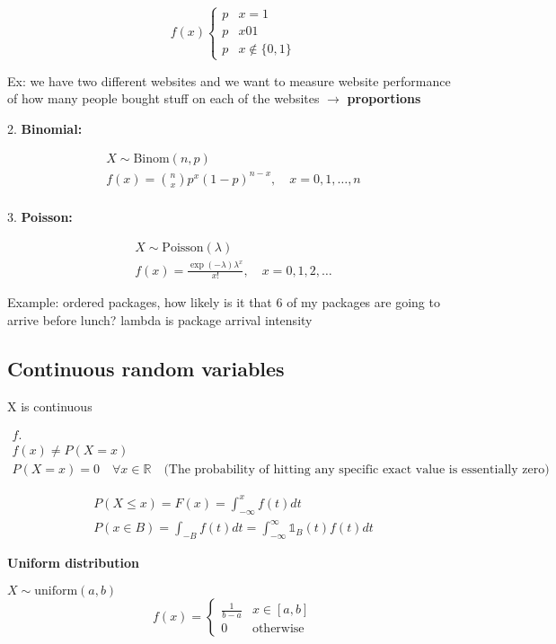 \documentclass[10pt]{article}
\begin{document}
\[
    f(x)
    \begin{cases}
        p & x = 1\\
        p & x 0 1\\
        p & x \notin \{0, 1\}
    \end{cases}
\]

Ex: we have two different websites and we want to measure website performance of how many people bought stuff on each
of the websites $\to$ \textbf{proportions}
\hfill

2. \textbf{Binomial:}

\begin{align*}
    X \sim \text{Binom}(n, p)\\
    f(x) = \binom{n}{x} p^x (1-p)^{n-x}, \quad x = 0, 1, …, n\\
\end{align*}

3. \textbf{Poisson:}

\begin{align*}
    X \sim \text{Poisson}(\lambda)\\
    f(x) = \frac{\exp (-\lambda)\lambda^x}{x!}, \quad x = 0, 1, 2, … 
\end{align*}

Example: ordered packages, how likely is it that 6 of my packages are going to arrive before lunch? lambda is package arrival intensity

\newpage

\subsection{Continuous random variables}

X is continuous 

\begin{align*}
    f. \\
    f(x) \neq P(X=x)\\
    P(X=x) = 0 \quad\forall x \in \mathbb{R} \quad\text{(The probability of hitting any specific exact value is essentially zero)}
\end{align*}

\begin{align*}
    P(X \leq x) = F(x) = \int_{-\infty}^{x}f(t)dt\\
    P(x \in B) = \int_{-B}f(t)dt = \int_{-\infty}^{\infty}\mathbb{1}_B(t)f(t)dt
\end{align*}

\textbf{Uniform distribution}

$X \sim \text{uniform}(a, b)$
\[
    f(x) = 
    \begin{cases}
        \frac{1}{b -a} & x \in [a, b]\\
        0 & \text{otherwise}
    \end{cases}
\]
\end{document}
